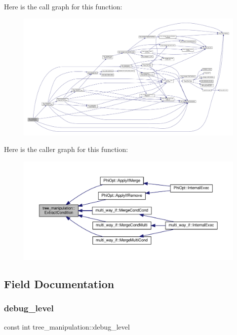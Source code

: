 Here is the call graph for this function\+:
\nopagebreak
\begin{figure}[H]
\begin{center}
\leavevmode
\includegraphics[width=350pt]{d0/d99/classtree__manipulation_a2c1beb9fa7745637dbc9e90f249432ae_cgraph}
\end{center}
\end{figure}
Here is the caller graph for this function\+:
\nopagebreak
\begin{figure}[H]
\begin{center}
\leavevmode
\includegraphics[width=350pt]{d0/d99/classtree__manipulation_a2c1beb9fa7745637dbc9e90f249432ae_icgraph}
\end{center}
\end{figure}


\subsection{Field Documentation}
\mbox{\label{classtree__manipulation_af0c337fee167d92263ac4783583a12a0}} 
\subsubsection{\texorpdfstring{debug\+\_\+level}{debug\_level}}
{\footnotesize\ttfamily const int tree\+\_\+manipulation\+::debug\+\_\+level\hspace{0.3cm}{\ttfamily [private]}}




